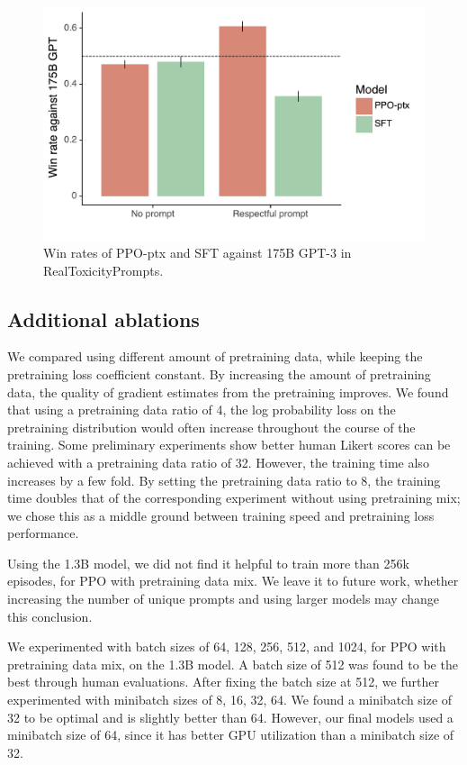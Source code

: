 \documentclass{article}
\begin{document}
\begin{figure}
    \centering
    \includegraphics[width=0.6\linewidth]{figs/toxicity-winrate.pdf}
    \caption{Win rates of PPO-ptx and SFT against 175B GPT-3 in RealToxicityPrompts.}
    \label{fig:toxicity-winrates}
\end{figure}


\subsection{Additional ablations}
\label{apdx:ablations}

We compared using different amount of pretraining data, while keeping the pretraining loss coefficient constant. By increasing the amount of pretraining data, the quality of gradient estimates from the pretraining improves. We found that using a pretraining data ratio of 4, the log probability loss on the pretraining distribution would often increase throughout the course of the training. Some preliminary experiments show better human Likert scores can be achieved with a pretraining data ratio of 32. However, the training time also increases by a few fold. By setting the pretraining data ratio to 8, the training time doubles that of the corresponding experiment without using pretraining mix; we chose this as a middle ground between training speed and pretraining loss performance.

Using the 1.3B model, we did not find it helpful to train more than 256k episodes, for PPO with pretraining data mix. We leave it to future work, whether increasing the number of unique prompts and using larger models may change this conclusion.

We experimented with batch sizes of 64, 128, 256, 512, and 1024, for PPO with pretraining data mix, on the 1.3B model. A batch size of 512 was found to be the best through human evaluations. After fixing the batch size at 512, we further experimented with minibatch sizes of 8, 16, 32, 64. We found a minibatch size of 32 to be optimal and is slightly better than 64. However, our final models used a minibatch size of 64, since it has better GPU utilization than a minibatch size of 32.
\end{document}
